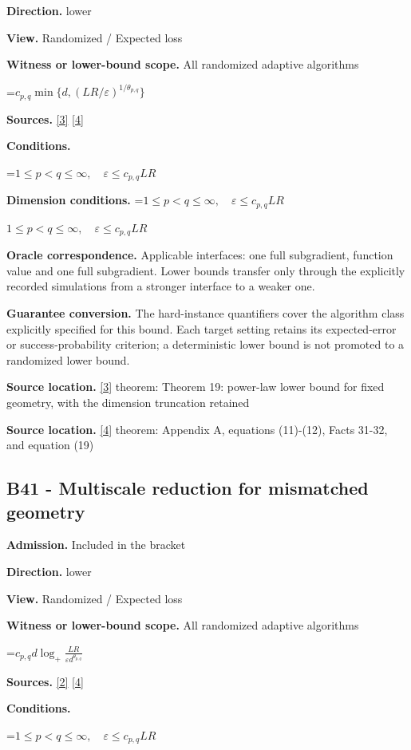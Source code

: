 \documentclass[10pt,a4paper]{article}
\newcommand{\AtlasMath}[1]{\par\begingroup\centering\setbox0=\hbox{$\displaystyle #1$}\ifdim\wd0>1.4\linewidth\typeout{ATLAS WIDE FORMULA: \the\wd0}\fi\ifdim\wd0>\linewidth\resizebox{\linewidth}{!}{\box0}\else\box0\fi\par\endgroup}
\newcommand{\AtlasInlineMath}[1]{\begingroup\setbox0=\hbox{$#1$}\ifdim\wd0>.4\linewidth\endgroup\AtlasMath{#1}\else\endgroup$#1$\fi}
\begin{document}
\textbf{Direction.} lower

\textbf{View.} Randomized / Expected loss

\textbf{Witness or lower-bound scope.} All randomized adaptive algorithms

\AtlasMath{c_{p,q}\min\{d,(LR/\varepsilon)^{1/\theta_{p,q}}\}}
\textbf{Sources.} \href{https://arxiv.org/pdf/2609.20701}{[3]} \href{https://arxiv.org/pdf/2609.20687}{[4]}

\textbf{Conditions.} 
\AtlasMath{1\le p<q\le\infty,\quad\varepsilon\le c_{p,q}LR}


\textbf{Dimension conditions.} \AtlasInlineMath{1\le p<q\le\infty,\quad\varepsilon\le c_{p,q}LR}

\textbf{Oracle correspondence.} Applicable interfaces: one full subgradient, function value and one full subgradient. Lower bounds transfer only through the explicitly recorded simulations from a stronger interface to a weaker one.

\textbf{Guarantee conversion.} The hard-instance quantifiers cover the algorithm class explicitly specified for this bound. Each target setting retains its expected-error or success-probability criterion; a deterministic lower bound is not promoted to a randomized lower bound.

\textbf{Source location.} \href{https://arxiv.org/pdf/2609.20701}{[3]} theorem: Theorem 19: power-law lower bound for fixed geometry, with the dimension truncation retained

\textbf{Source location.} \href{https://arxiv.org/pdf/2609.20687}{[4]} theorem: Appendix A, equations (11)-(12), Facts 31-32, and equation (19)

\subsection{B41 - Multiscale reduction for mismatched geometry}
\textbf{Admission.} Included in the bracket

\textbf{Direction.} lower

\textbf{View.} Randomized / Expected loss

\textbf{Witness or lower-bound scope.} All randomized adaptive algorithms

\AtlasMath{c_{p,q}d\log_+\frac{LR}{\varepsilon d^{\theta_{p,q}}}}
\textbf{Sources.} \href{https://arxiv.org/pdf/1407.5144}{[2]} \href{https://arxiv.org/pdf/2609.20687}{[4]}

\textbf{Conditions.} 
\AtlasMath{1\le p<q\le\infty,\quad\varepsilon\le c_{p,q}LR}
\end{document}
